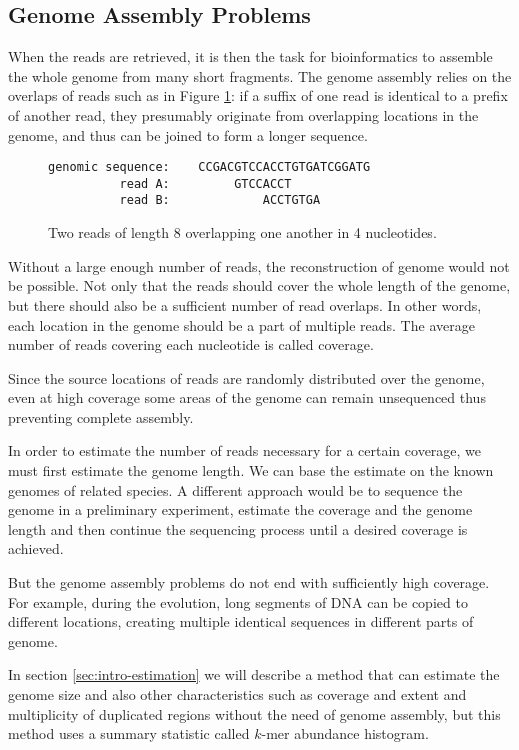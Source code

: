 \subsection{Genome Assembly Problems}
\label{sec:assembly}
When the reads are retrieved, it is then the task for bioinformatics to assemble the
whole genome from many short fragments. The genome assembly relies on the overlaps
of reads such as in Figure \ref{fig:overlapping-reads}: if a suffix of one read is
identical to a prefix of another read, they presumably originate from overlapping
locations in the genome, and thus can be joined to form a longer sequence.

\begin{figure}[h]
\centering
\begin{varwidth}{\linewidth}
\begin{verbatim}
genomic sequence:    CCGACGTCCACCTGTGATCGGATG
          read A:         GTCCACCT
          read B:             ACCTGTGA
\end{verbatim}
\end{varwidth}
\caption[Two overlapping reads]{Two reads of length 8 overlapping one another in 4 nucleotides.}
\label{fig:overlapping-reads}
\end{figure}

Without a large enough number of reads, the reconstruction of genome would not be possible.
Not only that the reads should cover the whole length of the genome, but there should also
be a sufficient number of read overlaps. In other words, each location in the genome should
be a part of multiple reads. The average number of reads covering each nucleotide
is called coverage. 

Since the source locations of reads are randomly distributed over the genome, even at high coverage
some areas of the genome can remain unsequenced thus preventing complete assembly.

In order to estimate the number of reads necessary for a certain coverage, we must first
estimate the genome length. We can base the estimate on the known genomes of related species.
A different approach would be to sequence the genome in a preliminary experiment, 
estimate the coverage and the genome length and then continue the sequencing process
until a desired coverage is achieved.

\medskip

But the genome assembly problems do not end with sufficiently high coverage.
For example, during the evolution, long segments of DNA can be copied to different locations, 
creating multiple identical sequences in different parts of genome. 

In section \ref{sec:intro-estimation} we will describe a method that can estimate
the genome size and also other characteristics such as coverage and extent and multiplicity
of duplicated regions without the need of genome assembly, but this method uses a summary 
statistic called $k$-mer abundance histogram.

